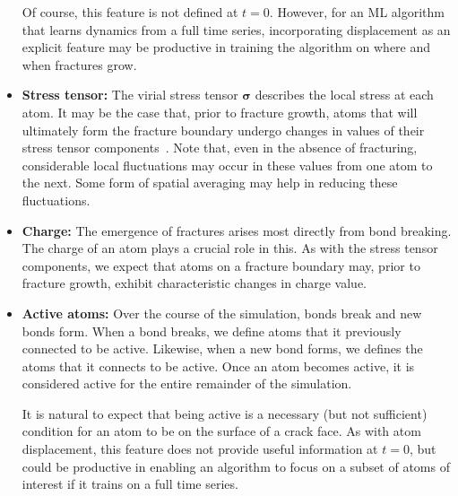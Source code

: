 \begin{itemize}
    Of course, this feature is not defined at $t=0$.  However, for an ML algorithm that learns dynamics from a full time series, incorporating displacement as an explicit feature may be productive in training the algorithm on where and when fractures grow.

    \item\textbf{Stress tensor:} The virial stress tensor $\boldsymbol{\sigma}$ describes the local stress at each atom.  It may be the case that, prior to fracture growth, atoms that will ultimately form the fracture boundary undergo changes in values of their stress tensor components~\cite{elastic_fracture}. Note that, even in the absence of fracturing, considerable local fluctuations may occur in these values from one atom to the next.  Some form of spatial averaging may help in reducing these fluctuations.

    \item\textbf{Charge:} The emergence of fractures arises most directly from bond breaking.  The charge of an atom plays a crucial role in this.  As with the stress tensor components, we expect that atoms on a fracture boundary may, prior to fracture growth, exhibit characteristic changes in charge value.
    
    \item \textbf{Active atoms:} Over the course of the simulation, bonds break and new bonds form.  When a bond breaks, we define atoms that it previously connected to be active.  Likewise, when a new bond forms, we defines the atoms that it connects to be active.  Once an atom becomes active, it is considered active for the entire remainder of the simulation.
    
    It is natural to expect that being active is a necessary (but not sufficient) condition for an atom to be on the surface of a crack face.  As with atom displacement, this feature does not provide useful information at $t=0$, but could be productive in enabling an algorithm to focus on a subset of atoms of interest if it trains on a full time series.
\end{itemize}

